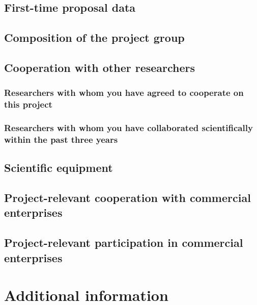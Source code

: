 \documentclass[11pt]{article}
\begin{document}
\vspace{-1ex}\subsection{First-time proposal data}

\vspace{-1ex}\subsection{Composition of the project group}

\vspace{-1ex}\subsection{Cooperation with other researchers}

\vspace{-1ex}\subsubsection{Researchers with whom you have agreed to cooperate on this project}

\vspace{-1ex}\subsubsection{Researchers with whom you have collaborated scientifically within the past three years}

\vspace{-1ex}\subsection{Scientific equipment}

\vspace{-1ex}\subsection{Project-relevant cooperation with commercial enterprises}

\vspace{-1ex}\subsection{Project-relevant participation in commercial enterprises}

\vspace{-1ex}\section{Additional information}
\end{document}
